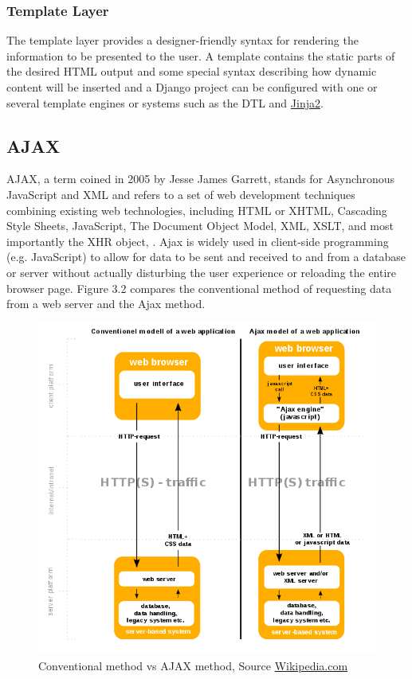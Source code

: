 \subsubsection{Template Layer}
The template layer provides a designer-friendly syntax for rendering the information to be presented to the user. A template contains the static parts of the desired \ac{HTML} output and some special syntax describing how dynamic content will be inserted and a Django project can be configured with one or several template engines or systems such as the \ac{DTL} and \href{http://jinja.pocoo.org/}{Jinja2}.
\subsection{\ac{AJAX}}
\ac{AJAX}, a term coined in 2005 by Jesse James Garrett, stands for Asynchronous JavaScript and \ac{XML} and refers to a set of web development techniques combining existing web technologies, including \ac{HTML} or \ac{XHTML}, Cascading Style Sheets, JavaScript, The Document Object Model, \ac{XML}, \ac{XSLT}, and most importantly the \ac{XHR} object, \citet{Yang:2020}. Ajax is widely used in client-side programming (e.g. JavaScript) to allow for data to be sent and received to and from a database or server without actually disturbing the user experience or reloading the entire browser page. Figure 3.2 compares the conventional method of requesting data from a web server and the Ajax method.
\begin{figure}[!htbp]
	\centering
	\includegraphics[width=1\textwidth]{./Ajax.png}
	\caption{Conventional method vs \ac{AJAX} method, Source \href{https://en.wikipedia.org/wiki/File:Ajax-vergleich-en.svg}{Wikipedia.com}}
\end{figure}

